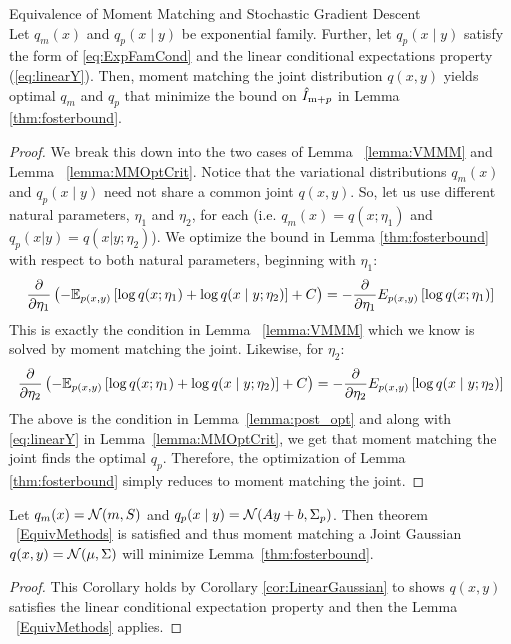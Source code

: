 \renewcommand\thetheorem{4.7}
\begin{theorem}{Equivalence of Moment Matching and Stochastic Gradient Descent}\\
    Let $q_m(x)$ and $q_p(x\mid y)$ be exponential family.  Further, let
    $q_p(x\mid y)$ satisfy the form of \EQN\eqref{eq:ExpFamCond} and the
    linear conditional expectations property (\EQN\eqref{eq:linearY}).
    Then, moment matching the joint distribution $q(x,y)$ yields optimal
    $q_m$ and $q_p$ that minimize the bound on $\hat{I}_{\text{m}+p}$ in
    Lemma \ref{thm:fosterbound}.
  \end{theorem}
\begin{proof}
    We break this down into the two cases of Lemma ~\ref{lemma:VMMM}
    and Lemma ~\ref{lemma:MMOptCrit}.  Notice that the variational
    distributions $q_m(x)$ and $q_p(x \mid y)$ need not share a common joint
    $q(x,y)$.  So, let us use different natural parameters, $\eta_1$
    and $\eta_2$, for each (i.e. $q_m(x)=q(x;\eta_1)$ and
    $q_p(x|y)=q(x|y;\eta_2)$). We optimize the bound in
    Lemma \ref{thm:fosterbound} with respect to both natural
    parameters, beginning with $\eta_1$:
    \[\dfrac{\partial}{\partial \eta_1}\left(-\mathbb{E}_{p(x,y)}\left[\log q(x;\eta_1)+\log q(x\mid y;\eta_2)\right]+C\right)=-\dfrac{\partial}{\partial \eta_1}E_{p(x,y)}\left[\log q(x;\eta_1)\right]\]
    This is exactly the condition in Lemma ~\ref{lemma:VMMM} which we know is 
    solved by moment matching the joint. Likewise, for $\eta_2$:
    \[\dfrac{\partial}{\partial \eta_2}\left(-\mathbb{E}_{p(x,y)}\left[\log q(x;\eta_1)+\log q(x\mid y;\eta_2)\right]+C\right)=-\dfrac{\partial}{\partial \eta_2}E_{p(x,y)}\left[\log q(x\mid y;\eta_2)\right]\]
    The above is the condition in Lemma~\ref{lemma:post_opt} and along with \EQN\eqref{eq:linearY} 
    in Lemma~\ref{lemma:MMOptCrit}, we get that moment matching the joint finds 
    the optimal $q_p$. Therefore, the optimization of Lemma \ref{thm:fosterbound} simply reduces
    to moment matching the joint.
\end{proof}

\renewcommand\thetheorem{4.8}
\begin{corollary}
    Let $q_m(x)=\mathcal{N}(m,S)$ and $q_p(x\mid y)=\mathcal{N}(Ay+b,\Sigma_p)$. Then theorem 
    ~\ref{EquivMethods}  is satisfied and thus moment matching a Joint Gaussian 
    $q(x,y)=\mathcal{N}(\mu, \Sigma)$ will minimize Lemma~\ref{thm:fosterbound}.
  \end{corollary}
\begin{proof}
    This Corollary holds by Corollary \ref{cor:LinearGaussian} to shows $q(x, y)$ satisfies the
    linear conditional expectation property and then the Lemma ~\ref{EquivMethods} applies.
\end{proof}



